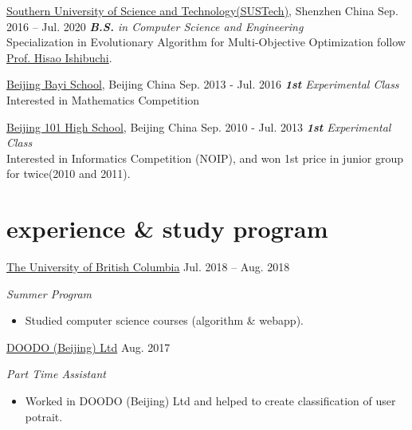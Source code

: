 \documentclass[hidelinks__VERSION__]{adamyi-cv}
\begin{document}
\begin{entrylist}


\entry
{\href{https://www.sustech.edu.cn/}{Southern University of Science and Technology(SUSTech)}, Shenzhen China}
{Sep. 2016 -- Jul. 2020}
{\emph{\textbf{B.S.} in Computer Science and Engineering}\\
Specialization in Evolutionary Algorithm for Multi-Objective Optimization follow \href{http://cse.sustc.edu.cn/en/people/view/people_id/55/sort_id/9/pid/}{Prof. Hisao Ishibuchi}.
}

\entry
{\href{http://bayims.cn/}{Beijing Bayi School}, Beijing China}
{Sep. 2013 - Jul. 2016}
{\emph{\textbf{1st} Experimental Class}\\
Interested in Mathematics Competition
}

\entry
{\href{http://beijing101.com}{Beijing 101 High School}, Beijing China}
{Sep. 2010 - Jul. 2013}
{\emph{\textbf{1st} Experimental Class}\\
Interested in Informatics Competition (NOIP), and won 1st price in junior group for twice(2010 and 2011).
}

\end{entrylist}


\section{experience \& study program}

\begin{entrylist}


\entry
{\href{https://www.ubc.ca/}{The University of British Columbia}}
{Jul. 2018 -- Aug. 2018}
{\emph{Summer Program}
\begin{itemize}
\item Studied computer science courses (algorithm \& webapp).
\end{itemize}}


\entry
{\href{http://www.doodod.com/}{DOODO (Beijing) Ltd}}
{Aug. 2017}
{\emph{Part Time Assistant}
\begin{itemize}
\item Worked in DOODO (Beijing) Ltd and helped to create classification of user potrait.
\end{itemize}}


\end{entrylist}
\end{document}
